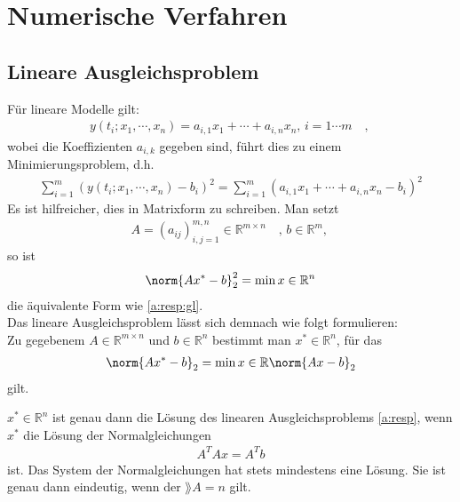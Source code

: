 \section{Numerische Verfahren}
\subsection{Lineare Ausgleichsproblem}
Für lineare Modelle gilt:
\begin{align}
	y(t_i; x_1, \cdots, x_n) = a_{i, 1} x_1 + \cdots + a_{i, n} x_n \text{, } i = 1 \cdots m \quad \text{, }
\end{align}
wobei die Koeffizienten $a_{i, k}$ gegeben sind, führt dies zu einem Minimierungsproblem, d.h.
\begin{align}
	\sum_{i=1}^m (y(t_i; x_1, \cdots, x_n) - b_i)^2 = \sum_{i=1}^m (a_{i, 1} x_1 + \cdots + a_{i, n} x_n - b_i)^2 \label{a:resp:gl}
\end{align}
Es ist hilfreicher, dies in Matrixform zu schreiben. Man setzt
\begin{align}
	A=(a_{ij})^{m, n}_{i, j = 1} \in \mathbb{R}^{m \times n} \quad \text{, } b \in \mathbb{R}^m \text{, }
\end{align}
so ist 
\begin{align} 
	\norm{Ax^* - b}^2_2 = \min{x \in \mathbb{R}^n}\label{a:resp:alternativ}
\end{align}
die äquivalente Form wie \ref{a:resp:gl}.\\

Das lineare Ausgleichsproblem lässt sich demnach wie folgt formulieren: \\
Zu gegebenem $A \in \mathbb{R}^{m \times n}$ und $b \in \mathbb{R}^n$ bestimmt man $x^* \in \mathbb{R}^n$, für das
\begin{align}
	\norm{Ax^* - b}_2 = \min{x \in \mathbb{R}} \norm{A x - b}_2 \label{a:resp}
\end{align} gilt.
\begin{satz}
	$x^* \in \mathbb{R}^n$ ist genau dann die Lösung des linearen Ausgleichsproblems \ref{a:resp}, wenn $x^*$  die Lösung der Normalgleichungen 
	\begin{align}
		A^T A x = A^T b
	\end{align} ist.
	Das System der Normalgleichungen hat stets mindestens eine Lösung. Sie ist genau dann eindeutig, wenn der $\rang{A} = n$ gilt.
\end{satz}\cite[Seite 122]{Dahmen2008}
